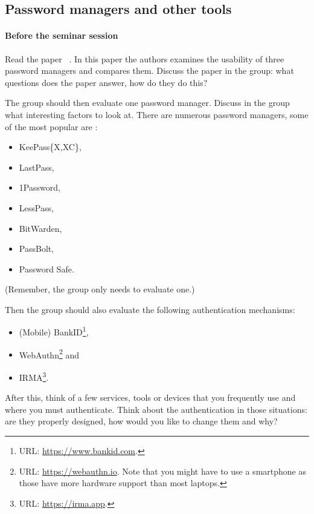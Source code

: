 \subsection{Password managers and other tools}%
\label{password-managers-tools}

\paragraph{Before the seminar session}

Read the paper 
~\cite{UsabilityEvaluationOfPasswordManagers}.
In this paper the authors examines the usability of three password managers and 
compares them.
Discuss the paper in the group: what questions does the paper answer, how do 
they do this?

The group should then evaluate one password manager.
Discuss in the group what interesting factors to look at.
There are numerous password managers, some of the most popular are \eg:
\begin{itemize}
  \item KeePass\{X,XC\},
  \item LastPass,
  \item 1Password,
  \item LessPass,
  \item BitWarden,
  \item PassBolt,
  \item Password Safe.
\end{itemize}
(Remember, the group only needs to evaluate one.)

Then the group should also evaluate the following authentication mechanisms:
\begin{itemize}
  \item (Mobile) BankID\footnote{%
      URL: \url{https://www.bankid.com}.
    },
  \item WebAuthn\footnote{%
      URL: \url{https://webauthn.io}.
      Note that you might have to use a smartphone as those have more hardware 
      support than most laptops.
    } and
  \item IRMA\footnote{%
      URL: \url{https://irma.app}.
    }.
\end{itemize}

After this, think of a few services, tools or devices that you frequently use 
and where you must authenticate.
Think about the authentication in those situations: are they properly designed, 
how would you like to change them and why?

